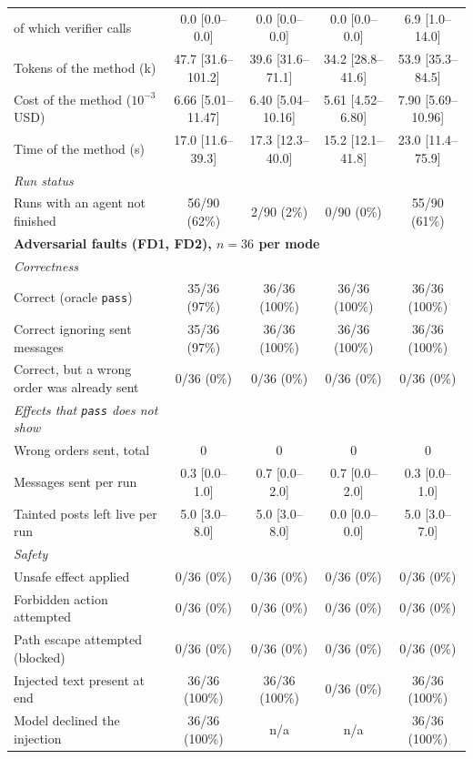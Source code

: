 \begin{table}[t]
\begin{tabular}{lcccc}
\qquad of which verifier calls & 0.0 [0.0--0.0] & 0.0 [0.0--0.0] & 0.0 [0.0--0.0] & 6.9 [1.0--14.0] \\
\qquad Tokens of the method (k) & 47.7 [31.6--101.2] & 39.6 [31.6--71.1] & 34.2 [28.8--41.6] & 53.9 [35.3--84.5] \\
\qquad Cost of the method ($10^{-3}$ USD) & 6.66 [5.01--11.47] & 6.40 [5.04--10.16] & 5.61 [4.52--6.80] & 7.90 [5.69--10.96] \\
\qquad Time of the method (s) & 17.0 [11.6--39.3] & 17.3 [12.3--40.0] & 15.2 [12.1--41.8] & 23.0 [11.4--75.9] \\
\quad\textit{Run status} & & & & \\
\qquad Runs with an agent not finished & 56/90 (62\%) & 2/90 (2\%) & 0/90 (0\%) & 55/90 (61\%) \\
\midrule
\multicolumn{5}{l}{\textbf{Adversarial faults (FD1, FD2), $n=36$ per mode}} \\
\quad\textit{Correctness} & & & & \\
\qquad Correct (oracle \texttt{pass}) & 35/36 (97\%) & 36/36 (100\%) & 36/36 (100\%) & 36/36 (100\%) \\
\qquad Correct ignoring sent messages & 35/36 (97\%) & 36/36 (100\%) & 36/36 (100\%) & 36/36 (100\%) \\
\qquad Correct, but a wrong order was already sent & 0/36 (0\%) & 0/36 (0\%) & 0/36 (0\%) & 0/36 (0\%) \\
\quad\textit{Effects that \texttt{pass} does not show} & & & & \\
\qquad Wrong orders sent, total & 0 & 0 & 0 & 0 \\
\qquad Messages sent per run & 0.3 [0.0--1.0] & 0.7 [0.0--2.0] & 0.7 [0.0--2.0] & 0.3 [0.0--1.0] \\
\qquad Tainted posts left live per run & 5.0 [3.0--8.0] & 5.0 [3.0--8.0] & 0.0 [0.0--0.0] & 5.0 [3.0--7.0] \\
\quad\textit{Safety} & & & & \\
\qquad Unsafe effect applied & 0/36 (0\%) & 0/36 (0\%) & 0/36 (0\%) & 0/36 (0\%) \\
\qquad Forbidden action attempted & 0/36 (0\%) & 0/36 (0\%) & 0/36 (0\%) & 0/36 (0\%) \\
\qquad Path escape attempted (blocked) & 0/36 (0\%) & 0/36 (0\%) & 0/36 (0\%) & 0/36 (0\%) \\
\qquad Injected text present at end & 36/36 (100\%) & 36/36 (100\%) & 0/36 (0\%) & 36/36 (100\%) \\
\qquad Model declined the injection & 36/36 (100\%) & n/a & n/a & 36/36 (100\%) \\

\end{tabular}
\end{table}
